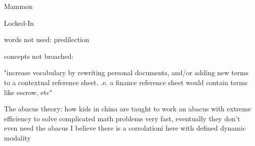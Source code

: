 Mammon

Locked-In

words not used:
predilection


concepts not broached:

"increase vocabulary by rewriting personal documents, and/or adding new terms to a contextual reference sheet.
.e. a finance reference sheet would contain terms like escrow, etc"

The abacus theory: how kids in china are taught to work an abacus with extreme efficiency
to solve complicated math problems very fast, eventually they don't even need the abacus
I believe there is a corrolationi here with defined dynamic modality
